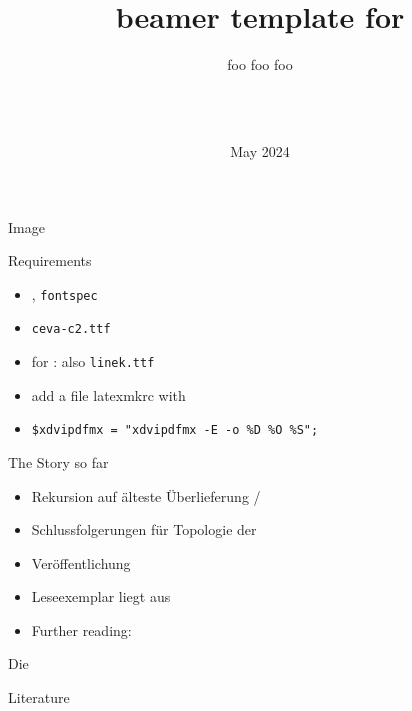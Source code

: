 \documentclass[t,dvipsnames]{beamer}
\title{beamer template for \ceva{c-base}}
\subtitle{foo foo foo}
\author{\ceva{c-base cience ring}\\\ceva{\&}\\\ceva{penta - ms. cience}}%
\date{May 2024}
\begin{document}
\frame{\titlepage}

\begin{frame}{Image}
    \resizebox{!}{0.8\textheight}{}
\end{frame}

\begin{frame}{Requirements}
    \begin{itemize}
        \item \XeLaTeX, \texttt{fontspec}
        \item \texttt{ceva-c2.ttf}
        \item for : also \texttt{linek.ttf}
        \item add a file latexmkrc with
        \item[]  \texttt{\$xdvipdfmx = "xdvipdfmx -E -o \%D \%O \%S";}
    \end{itemize}
\end{frame}

\begin{frame}{The Story so far}
\end{frame}

\begin{frame}{}
    \begin{itemize}
        \item Rekursion auf älteste Überlieferung / 
        \item Schlussfolgerungen für Topologie der 
        \item Veröffentlichung  \cite{penta2024}
        \item Leseexemplar liegt aus
        \item Further reading: \cite{adams1981restaurant}
    \end{itemize}
\end{frame}



\begin{frame}{Die }
\end{frame}

\begin{frame}[allowframebreaks]{Literature}
    \printbibliography
\end{frame}
\end{document}
